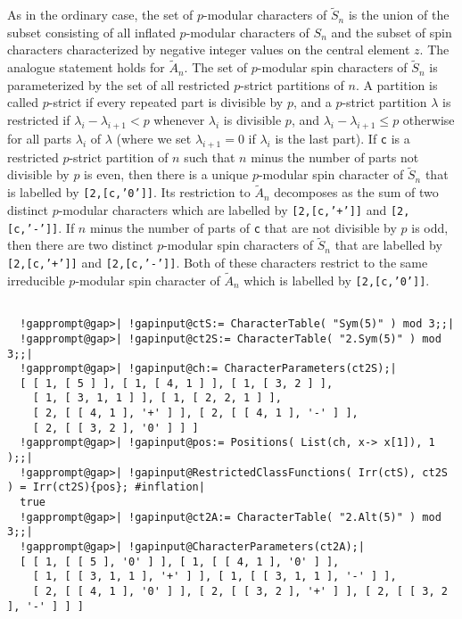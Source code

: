 \documentclass[a4paper,11pt]{report}
\begin{document}
{{{ As in the ordinary case, the set of $p$-modular characters of  $\tilde{S}_n$ is the union of the subset consisting of all inflated $p$-modular characters of $S_n$  and the subset of spin characters characterized by negative integer values on
the central element $z$. The analogue statement holds for $\tilde{A}_n$. The set of $p$-modular spin characters of  $\tilde{S}_n$ is parameterized by the set of all restricted $p$-strict partitions of $n$. A partition is called $p$-strict if every repeated part is divisible by $p$, and a $p$-strict partition $\lambda$ is restricted if $\lambda_i-\lambda_{i+1}<p$ whenever $\lambda_i$ is divisible $p$, and $\lambda_i-\lambda_{i+1}\leq p$ otherwise for all parts $\lambda_i$ of $\lambda$ (where we set $\lambda_{i+1}=0$ if $\lambda_i$ is the last part). If \texttt{c} is a restricted $p$-strict partition of $n$ such that $n$ minus the number of parts not divisible by $p$ is even, then there is a unique $p$-modular spin character of  $\tilde{S}_n$ that is labelled by \texttt{[2,[c,'0']]}. Its restriction to  $\tilde{A}_n$ decomposes as the sum of two distinct $p$-modular characters which are labelled by \texttt{[2,[c,'+']]} and \texttt{[2,[c,'-']]}. If $n$ minus the number of parts of \texttt{c} that are not divisible by $p$ is odd, then there are two distinct $p$-modular spin characters of  $\tilde{S}_n$ that are labelled by \texttt{[2,[c,'+']]} and \texttt{[2,[c,'-']]}. Both of these characters restrict to the same irreducible $p$-modular spin character of  $\tilde{A}_n$ which is labelled by \texttt{[2,[c,'0']]}. 
\begin{Verbatim}[commandchars=!@|,fontsize=\small,frame=single,label=Example]
  
  !gapprompt@gap>| !gapinput@ctS:= CharacterTable( "Sym(5)" ) mod 3;;|
  !gapprompt@gap>| !gapinput@ct2S:= CharacterTable( "2.Sym(5)" ) mod 3;;|
  !gapprompt@gap>| !gapinput@ch:= CharacterParameters(ct2S);|
  [ [ 1, [ 5 ] ], [ 1, [ 4, 1 ] ], [ 1, [ 3, 2 ] ], 
    [ 1, [ 3, 1, 1 ] ], [ 1, [ 2, 2, 1 ] ], 
    [ 2, [ [ 4, 1 ], '+' ] ], [ 2, [ [ 4, 1 ], '-' ] ], 
    [ 2, [ [ 3, 2 ], '0' ] ] ]
  !gapprompt@gap>| !gapinput@pos:= Positions( List(ch, x-> x[1]), 1 );;|
  !gapprompt@gap>| !gapinput@RestrictedClassFunctions( Irr(ctS), ct2S ) = Irr(ct2S){pos}; #inflation|
  true
  !gapprompt@gap>| !gapinput@ct2A:= CharacterTable( "2.Alt(5)" ) mod 3;;|
  !gapprompt@gap>| !gapinput@CharacterParameters(ct2A);|
  [ [ 1, [ [ 5 ], '0' ] ], [ 1, [ [ 4, 1 ], '0' ] ], 
    [ 1, [ [ 3, 1, 1 ], '+' ] ], [ 1, [ [ 3, 1, 1 ], '-' ] ], 
    [ 2, [ [ 4, 1 ], '0' ] ], [ 2, [ [ 3, 2 ], '+' ] ], [ 2, [ [ 3, 2 ], '-' ] ] ]
  

\end{Verbatim}}}}
\end{document}
